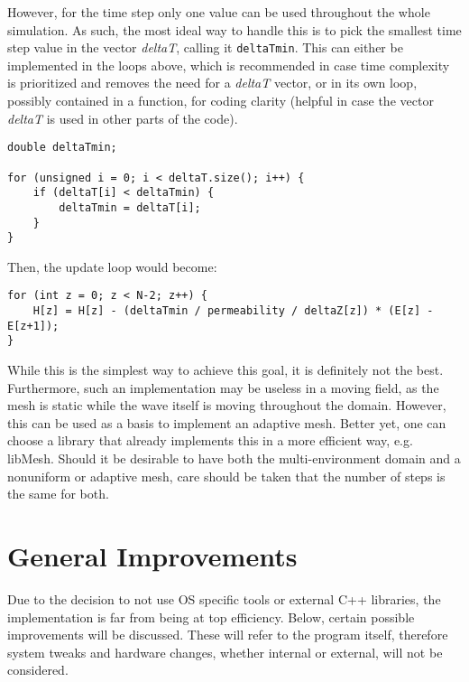\clearpage

However, for the time step only one value can be used throughout the whole simulation. As such, the most ideal way to handle this is to pick the smallest time step value in the vector \textit{deltaT}, calling it \verb|deltaTmin|. This can either be implemented in the loops above, which is recommended in case time complexity is prioritized and removes the need for a \textit{deltaT} vector, or in its own loop, possibly contained in a function, for coding clarity (helpful in case the vector \textit{deltaT} is used in other parts of the code).

\begin{verbatim}
double deltaTmin;

for (unsigned i = 0; i < deltaT.size(); i++) {
	if (deltaT[i] < deltaTmin) {
		deltaTmin = deltaT[i];
	}
}
\end{verbatim}

Then, the update loop would become:

\begin{verbatim}
for (int z = 0; z < N-2; z++) {
	H[z] = H[z] - (deltaTmin / permeability / deltaZ[z]) * (E[z] - E[z+1]);
}
\end{verbatim}

While this is the simplest way to achieve this goal, it is definitely not the best. Furthermore, such an implementation may be useless in a moving field, as the mesh is static while the wave itself is moving throughout the domain. However, this can be used as a basis to implement an adaptive mesh. Better yet, one can choose a library that already implements this in a more efficient way, e.g. libMesh\textsuperscript{\cite{kirk2006libmesh}}. Should it be desirable to have both the multi-environment domain and a nonuniform or adaptive mesh, care should be taken that the number of steps is the same for both.

\section{General Improvements}

Due to the decision to not use OS specific tools or external C++ libraries, the implementation is far from being at top efficiency. Below, certain possible improvements will be discussed. These will refer to the program itself, therefore system tweaks and hardware changes, whether internal or external, will not be considered.

